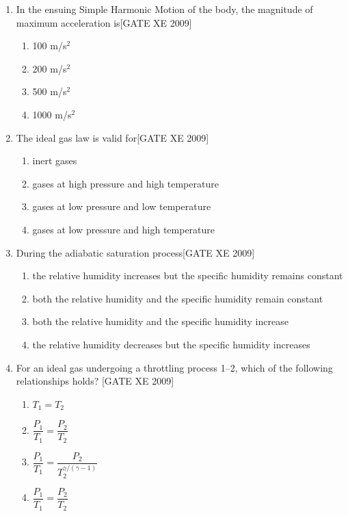 \documentclass[journal,12pt,onecolumn]{IEEEtran}
\theoremstyle{remark}
\begin{document}
\begin{enumerate}
\item In the ensuing Simple Harmonic Motion of the body, the magnitude of maximum acceleration is\hfill[GATE XE 2009]
\begin{multicols}{2}
\begin{enumerate}
    \item 100 m/s$^2$
    \item 200 m/s$^2$
    \item 500 m/s$^2$
    \item 1000 m/s$^2$ 
  
    \end{enumerate}
      \end{multicols}
   



\item The ideal gas law is valid for\hfill[GATE XE 2009]
\begin{multicols}{2}
\begin{enumerate}
    \item inert gases
    \item gases at high pressure and high temperature
    \item gases at low pressure and low temperature
    \item gases at low pressure and high temperature
\end{enumerate}
\end{multicols}



\item During the adiabatic saturation process\hfill[GATE XE 2009]
\begin{multicols}{2}
\begin{enumerate}
    \item the relative humidity increases but the specific humidity remains constant
    \item both the relative humidity and the specific humidity remain constant
    \item both the relative humidity and the specific humidity increase
    \item the relative humidity decreases but the specific humidity increases
\end{enumerate}
\end{multicols}



\item For an ideal gas undergoing a throttling process 1--2, which of the following relationships holds?
\hfill[GATE XE 2009]
\begin{multicols}{2}
\begin{enumerate}
    \item $T_1 = T_2$
    \item $\dfrac{P_1}{T_1} = \dfrac{P_2}{T_2}$
    \item $\dfrac{P_1}{T_1} = \dfrac{P_2}{T_2^{\gamma/(\gamma - 1)}}$
    \item $\dfrac{P_1}{T_1} = \dfrac{P_2}{T_2}$
\end{enumerate}
\end{multicols}




\end{enumerate}
\end{document}
